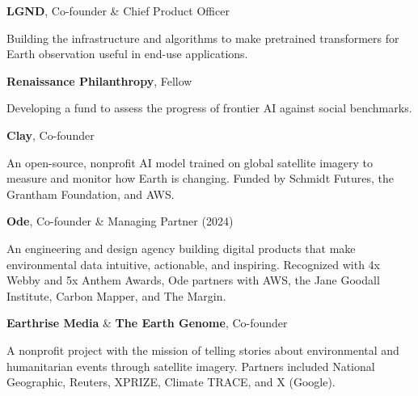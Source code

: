 \documentclass[10pt,letterpaper]{article}
\renewenvironment{itemize}{
  \begin{list}{}{
    \setlength{\leftmargin}{1.5em}
    \setlength{\itemsep}{0.25em}
    \setlength{\parskip}{0pt}
    \setlength{\parsep}{0.25em}
  }
}{
  \end{list}
}
\begin{document}
\begin{itemize}

\item \textbf{LGND}, Co-founder \& Chief Product Officer
  \begin{itemize}
  \item Building the infrastructure and algorithms to make pretrained transformers for Earth observation useful in end-use applications.
  \end{itemize}

\item \textbf{Renaissance Philanthropy}, Fellow
  \begin{itemize}
  \item Developing a fund to assess the progress of frontier AI against social benchmarks.
  \end{itemize}


\item \textbf{Clay}, Co-founder
  \begin{itemize}
  \item An open-source, nonprofit AI model trained on global satellite imagery to measure and monitor how Earth is changing. Funded by Schmidt Futures, the Grantham Foundation, and AWS.
  \end{itemize}

\item \textbf{Ode}, Co-founder \& Managing Partner (2024)
  \begin{itemize}
  \item An engineering and design agency building digital products that make environmental data intuitive, actionable, and inspiring. Recognized with 4x Webby and 5x Anthem Awards, Ode partners with AWS, the Jane Goodall Institute, Carbon Mapper, and The Margin.
  \end{itemize}

\item \textbf{Earthrise Media} \& \textbf{The Earth Genome}, Co-founder
  \begin{itemize}
  \item A nonprofit project with the mission of telling stories about environmental and humanitarian events through satellite imagery. Partners included National Geographic, Reuters, XPRIZE, Climate TRACE, and X (Google).
  \end{itemize}


\end{itemize}
\end{document}
